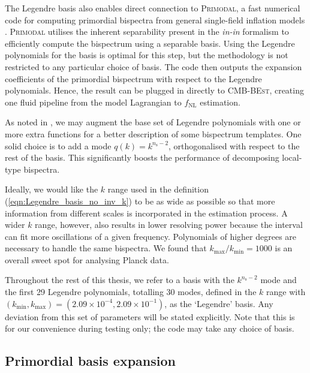 The Legendre basis also enables direct connection to \textsc{Primodal}, a fast numerical code for computing primordial bispectra from general single-field inflation models \cite{Clarke2021}. \textsc{Primodal} utilises the inherent separability present in the \textit{in-in} formalism to efficiently compute the bispectrum using a separable basis. Using the Legendre polynomials for the basis is optimal for this step, but the methodology is not restricted to any particular choice of basis. The code then outputs the expansion coefficients of the primordial bispectrum with respect to the Legendre polynomials. Hence, the result can be plugged in directly to \textsc{CMB-BEst}, creating one fluid pipeline from the model Lagrangian to $f_\text{NL}$ estimation.

As noted in \cite{Clarke2021}, we may augment the base set of Legendre polynomials with one or more extra functions for a better description of some bispectrum templates. One solid choice is to add a mode $q(k) = k^{n_\text{s} -2}$, orthogonalised with respect to the rest of the basis. This significantly boosts the performance of decomposing local-type bispectra.

Ideally, we would like the $k$ range used in the definition (\ref{eqn:Legendre_basis_no_inv_k}) to be as wide as possible so that more information from different scales is incorporated in the estimation process. A wider $k$ range, however, also results in lower resolving power because the interval can fit more oscillations of a given frequency. Polynomials of higher degrees are necessary to handle the same bispectra. We found that $k_\text{max}/k_\text{min} = 1000$ is an overall sweet spot for analysing Planck data.

Throughout the rest of this thesis, we refer to a basis with the $k^{n_\text{s} - 2}$ mode and the first 29 Legendre polynomials, totalling 30 modes, defined in the $k$ range with $(k_\text{min}, k_\text{max}) = (2.09 \times 10^{-4}, 2.09 \times 10^{-1})$, as the `Legendre' basis. Any deviation from this set of parameters will be stated explicitly. Note that this is for our convenience during testing only; the code may take any choice of basis.


\subsection{Primordial basis expansion} \label{section:primordial_basis_expansion}

